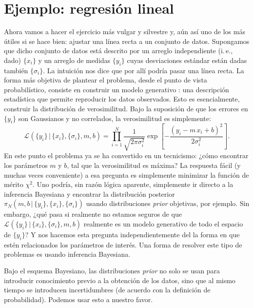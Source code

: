 \documentclass[a4paper,twoside]{article}
\newcommand{\br}{\ensuremath{\,|\,}\xspace}
\newcommand{\pos}[2]{\ensuremath{\pi_N\left(#1\br #2\right)}\xspace}
\newcommand{\lik}[3][]{\ensuremath{\mathcal{L}_{#1}\left(#2\br #3\right)}\xspace}
\begin{document}

\section{Ejemplo: regresión lineal}
%
Ahora vamos a hacer el ejercicio más vulgar y silvestre y, aún así uno de los más útiles si se hace
bien: ajustar una línea recta a un conjunto de datos. Supongamos que dicho conjunto de datos está
descrito por un arreglo independiente (i.\,e., dado) \(\{x_i\}\) y un arreglo de medidas \(\{y_i\}\)
cuyas desviaciones estándar están dadas también \(\{\sigma_i\}\).
La intuición nos dice que por allí podría pasar una línea recta. La forma más objetiva de plantear
el problema, desde el punto de vista probabilístico, consiste en construir un modelo generativo
\citep{Hogg2010}: una descripción estadística que permite reproducir los datos observados. Esto es
esencialmente, construir la distribución de verosimilitud. Bajo la suposición de que los errores en
\(\{y_i\}\) son Gaussianos y no correlados, la verosimilitud es simplemente:
%
\[\lik{\{y_i\}}{\{x_i\},\{\sigma_i\},m,b} = \prod_{i=1}^N\frac{1}{\sqrt{2\pi\sigma_i^2}}\exp{\left[-\frac{\left(y_i-m\,x_i+b\right)^2}{2\sigma_i^2}\right]}.\]
%
En este punto el problema ya se ha convertido en un tecnicismo: ¿cómo encontrar los parámetros \(m\)
y \(b\), tal que la verosimilitud es máxima? La respuesta fácil (y muchas veces conveniente) a esa
pregunta es simplemente minimizar la función de mérito \(\chi^2\).
Uno podría, sin razón lógica aparente, simplemente ir directo a la inferencia Bayesiana y encontrar
la distribución posterior \(\pos{m,b}{\{y_i\},\{x_i\},\{\sigma_i\}}\) usando distribuciones
\emph{prior} objetivas, por ejemplo.
Sin embargo, ¿qué pasa si realmente no estamos seguros de que
\(\lik{\{y_i\}}{\{x_i\},\{\sigma_i\},m,b}\) realmente es un modelo generativo de todo el espacio de
\(\{y_i\}\)? Y nos hacemos esta pregunta independientemente del la forma en que estén relacionados
los parámetros de interés.
Una forma de resolver este tipo de problemas es usando inferencia Bayesiana.

Bajo el esquema Bayesiano, las distribuciones \emph{prior} no solo se usan para introducir
conocimiento previo a la obtención de los datos, sino que al mismo tiempo se introducen
incertidumbres (de acuerdo con la definición de probabilidad). Podemos usar esto a nuestro favor.
\end{document}
